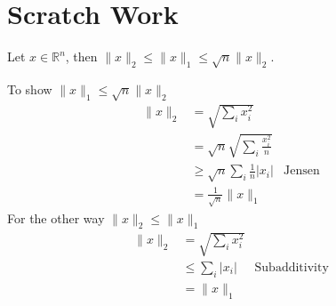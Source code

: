 \documentclass[12pt,fleqn]{article}
\numberwithin{equation}{section}
\theoremstyle{definition}
\theoremstyle{definition}
\renewenvironment{proof}[1][\proofname]{\vspace{-10pt}\begin{replacementproof}}{\end{replacementproof}}
\begin{document}
\section*{Scratch Work}
\begin{fact}
	Let $x \in \mathbb R^n$, then $\|x\|_2 \leq \|x\|_1 \leq \sqrt{n} \|x\|_2$.
\end{fact}
\begin{proof}
	To show $\|x\|_1 \leq \sqrt{n}\|x\|_2$
	\begin{align}
		\|x\|_2  & = \sqrt{\sum_i x_i^2}\\
		& = \sqrt{n} \sqrt{\sum_i \frac{x_i^2}{n}}\\
		& \geq \sqrt{n} \sum_i \frac{1}{n} |x_i| & \text{Jensen}\\
		& = \frac{1}{\sqrt{n}} \|x\|_1
	\end{align}
	For the other way $\|x\|_2 \leq \|x\|_1$
	\begin{align}
		\|x\|_2 & = \sqrt{\sum_i x_i^2}\\
		& \leq \sum_i |x_i| & \text{Subadditivity}\\
		& = \|x\|_1 
	\end{align}
\end{proof}

\begin{fact}
	
\end{fact}
\end{document}
